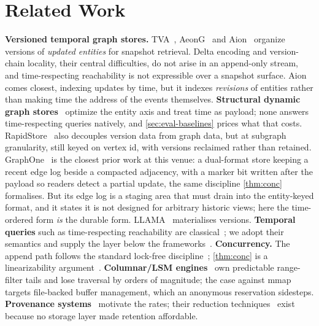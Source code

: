 \documentclass[letterpaper,twocolumn,10pt]{article}
\begin{document}
\section{Related Work}
\label{sec:related}
\textbf{Versioned temporal graph stores.} TVA~\cite{li2026tva},
AeonG~\cite{hou2024aeong} and Aion~\cite{theodorakis2024aion} organize
versions of \emph{updated entities} for snapshot retrieval. Delta
encoding and version-chain locality, their central difficulties, do not
arise in an append-only stream, and time-respecting reachability is not
expressible over a snapshot surface. Aion comes closest, indexing
updates by time, but it indexes \emph{revisions} of entities rather
than making time the address of the events themselves.
\textbf{Structural dynamic graph stores}~\cite{wheatman2021ppcsr,
shen2026dcsr, dhulipala2019aspen, fuchs2023sortledton,
pandey2021terrace, deleo2021teseo, zhu2020livegraph} optimize the
entity axis and treat time as payload; none answers time-respecting
queries natively, and \cref{sec:eval-baselines} prices what that costs.
RapidStore~\cite{hao2025rapidstore} also decouples version data from
graph data, but at subgraph granularity, still keyed on vertex id, with
versions reclaimed rather than retained.
GraphOne~\cite{kumar2019graphone} is the closest prior work at this
venue: a dual-format store keeping a recent edge log beside a compacted
adjacency, with a marker bit written after the payload so readers
detect a partial update, the same discipline \cref{thm:conc}
formalises. But its edge log is a staging area that must drain into the
entity-keyed format, and it states it is not designed for arbitrary
historic views; here the time-ordered form \emph{is} the durable form.
LLAMA~\cite{macko2015llama} materialises versions. \textbf{Temporal queries} such as time-respecting reachability are
classical~\cite{wu2014temporalpaths, holme2012temporal}; we adopt their
semantics and supply the layer below the
frameworks~\cite{shun2013ligra, kyrola2012graphchi}.
\textbf{Concurrency.} The append path follows the standard lock-free
discipline~\cite{michael1996nonblocking}; \cref{thm:conc} is a
linearizability argument~\cite{herlihy1990linearizability}.
\textbf{Columnar/LSM engines}~\cite{raasveldt2019duckdb} own predictable
range-filter tails and lose traversal by orders of magnitude; the case
against mmap~\cite{crotty2022mmap} targets file-backed buffer
management, which an anonymous reservation sidesteps.
\textbf{Provenance systems}~\cite{king2003backtracker,
pasquier2017camflow, zhang2025tapas, hassan2020omegalog} motivate the
rates; their reduction techniques~\cite{lee2013loggc} exist because no
storage layer made retention affordable.
\end{document}
